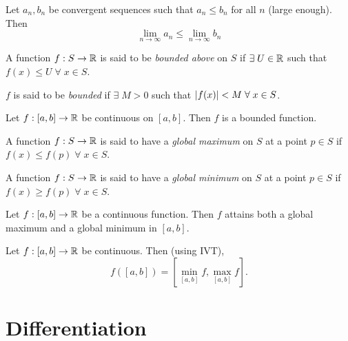 \documentclass[12pt]{article}
\begin{document}
\begin{lem} \label{thm:sequence:comparison}
    Let $a_{n}, b_{n}$ be convergent sequences such that $a_{n} \leq b_{n}$ for all $n$ (large enough). Then \[
        \lim_{n \to \infty} a_{n} \leq \lim_{n \to \infty} b_{n}
    \]
\end{lem}

\begin{defn} \label{defn:cont:bounded}
    A function $f : S \to \mathbb{R}$ is said to be \emph{bounded above} on $S$ if $\exists\; U \in \mathbb{R}$ such that $f(x) \leq U \;\forall\; x \in S$.

    $f$ is said to be \emph{bounded} if $\exists\; M > 0$ such that $\abs{f(x)} < M \;\forall\; x \in S$.
\end{defn}

\begin{thm} \label{thm:cont:compact_to_bounded}
    Let $f : [a, b] \to \mathbb{R}$ be continuous on $[a, b]$. Then $f$ is a bounded function.
\end{thm}

\begin{defn} \label{defn:cont:global_extrema}
    A function $f : S \to \mathbb{R}$ is said to have a \emph{global maximum} on $S$ at a point $p \in S$ if $f(x) \leq f(p) \;\forall\; x \in S$.

    A function $f : S \to \mathbb{R}$ is said to have a \emph{global minimum} on $S$ at a point $p \in S$ if $f(x) \geq f(p) \;\forall\; x \in S$.
\end{defn}

\begin{thm} \label{thm:cont:EVT}
    Let $f : [a, b] \to \mathbb{R}$ be a continuous function. Then $f$ attains both a global maximum and a global minimum in $[a, b]$.
\end{thm}

\begin{cor} \label{thm:cont:EVT:closed->closed}
    Let $f : [a, b] \to \mathbb{R}$ be continuous.
    Then (using IVT), \[
        f([a, b]) = [\min_{[a, b]} f, \max_{[a, b]} f].
    \]
\end{cor}

\section{Differentiation}
\end{document}
